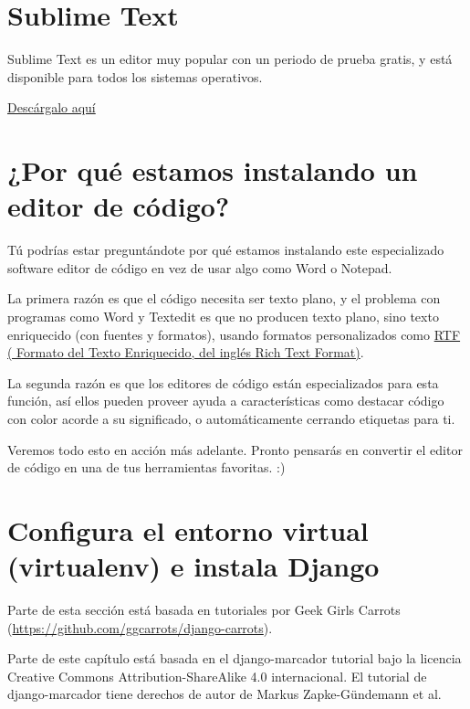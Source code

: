 \documentclass[
  a4paper,
  DIV=11,
  numbers=noendperiod,
  onepage,
  openany]{scrreprt}
\begin{document}
\chapter{Sublime Text}\label{sublime-text}

Sublime Text es un editor muy popular con un periodo de prueba gratis, y
está disponible para todos los sistemas operativos.

\href{https://www.sublimetext.com/}{Descárgalo aquí}

\chapter{¿Por qué estamos instalando un editor de
código?}\label{por-quuxe9-estamos-instalando-un-editor-de-cuxf3digo}

Tú podrías estar preguntándote por qué estamos instalando este
especializado software editor de código en vez de usar algo como Word o
Notepad.

La primera razón es que el código necesita ser texto plano, y el
problema con programas como Word y Textedit es que no producen texto
plano, sino texto enriquecido (con fuentes y formatos), usando formatos
personalizados como
\href{https://en.wikipedia.org/wiki/Rich_Text_Format}{RTF ( Formato del
Texto Enriquecido, del inglés Rich Text Format)}.

La segunda razón es que los editores de código están especializados para
esta función, así ellos pueden proveer ayuda a características como
destacar código con color acorde a su significado, o automáticamente
cerrando etiquetas para ti.

Veremos todo esto en acción más adelante. Pronto pensarás en convertir
el editor de código en una de tus herramientas favoritas. :)

\chapter{Configura el entorno virtual (virtualenv) e instala
Django}\label{configura-el-entorno-virtual-virtualenv-e-instala-django}

Parte de esta sección está basada en tutoriales por Geek Girls Carrots
(\url{https://github.com/ggcarrots/django-carrots}).

Parte de este capítulo está basada en el django-marcador tutorial bajo
la licencia Creative Commons Attribution-ShareAlike 4.0 internacional.
El tutorial de django-marcador tiene derechos de autor de Markus
Zapke-Gündemann et al.
\end{document}
